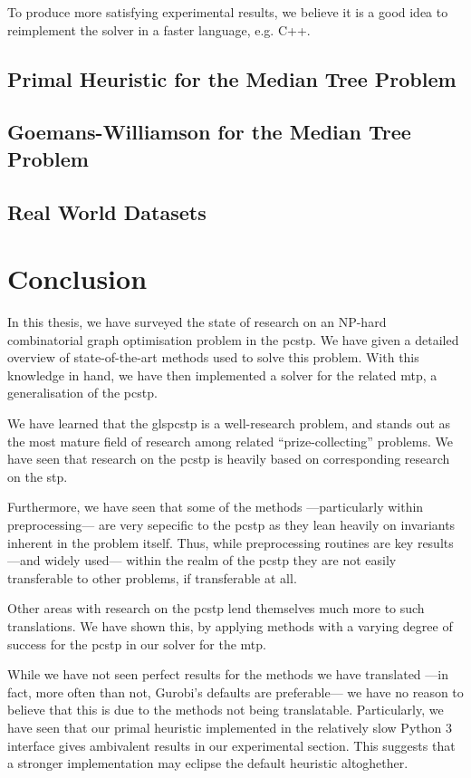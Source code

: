 To produce more satisfying experimental results, we believe it is a good idea to reimplement
the solver in a faster language, e.g. C++.

\subsection{Primal Heuristic for the Median Tree Problem}

\subsection{Goemans-Williamson for the Median Tree Problem}

\subsection{Real World Datasets}

\section{Conclusion}\label{sec:con:con}
In this thesis, we have surveyed the state of research on
an NP-hard combinatorial graph optimisation problem in
the \acrlong{pcstp}. We have given a detailed overview of state-of-the-art
methods used to solve this problem.
With this knowledge in hand, we have then implemented a solver for the related
\acrlong{mtp}, a generalisation of the \gls{pcstp}.

We have learned that the gls{pcstp}
is a well-research problem, and stands out as the most mature field of
research among related ``prize-collecting'' problems.
We have seen that research on the \gls{pcstp} is heavily based on corresponding
research on the \gls{stp}.

Furthermore, we have seen that some of the methods
---particularly within preprocessing---
are very sepecific to the \gls{pcstp} as they lean heavily on
invariants inherent in the problem itself. Thus, while preprocessing routines
are key results ---and widely used--- within the realm of the \gls{pcstp}
they are not easily transferable to other problems, if transferable at all.

Other areas with research on the \gls{pcstp} lend themselves much more to such
translations. We have shown this, by applying methods
with a varying degree of success for the
\gls{pcstp} in our solver for the \gls{mtp}.

While we have not seen perfect results for the methods we have translated
---in fact, more often than not, Gurobi's defaults are preferable---
we have no reason to believe that this is due to the methods not being
translatable. Particularly, we have seen that our primal heuristic implemented
in the relatively slow Python 3 interface gives ambivalent results in our experimental
section. This suggests that a stronger implementation may eclipse the default heuristic
altoghether.

